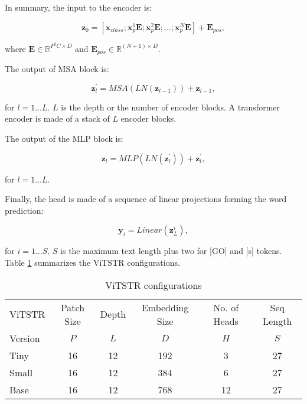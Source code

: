 \documentclass[runningheads]{llncs}
\begin{document}
In summary, the input to the encoder is:

\begin{equation}
\label{eq:encoder_input}
\textbf{z}_{0}=[\textbf{x}_{class};\textbf{x}^{1}_{p}\textbf{E};\textbf{x}^{2}_{p}\textbf{E};...;\textbf{x}^{N}_{p}\textbf{E}] + \textbf{E}_{pos},    
\end{equation}

where $\textbf{E}\in\mathbb{R}^{P^2C\times{D}}$ and $\textbf{E}_{pos}\in\mathbb{R}^{ (N+1)\times{D} }$.

The output of MSA block is:

\begin{equation}
\label{eq:msa}
\textbf{z}^{'}_{l}=MSA(LN(\textbf{z}_{l-1})) + \textbf{z}_{l-1},     
\end{equation}


for $l=1...L$. $L$ is the depth or the number of encoder blocks. A transformer encoder is made of a stack of $L$ encoder blocks. 

The output of the MLP block is:

\begin{equation}
\label{eq:mlp}
\textbf{z}_{l}=MLP(LN(\textbf{z}^{'}_{l})) + \textbf{z}^{'}_{l},  
\end{equation}


for $l=1...L$.

Finally, the head is made of a sequence of linear projections forming the word prediction:

\begin{equation}
   \label{eq:head}
\textbf{y}_{i}=Linear(\textbf{z}^{i}_{L}), 
\end{equation}





for $i=1...S$. $S$ is the maximum text length plus two for [GO] and [s] tokens. Table \ref{tab:vitstr_config} summarizes the ViTSTR configurations.


\begin{table}
\caption{ViTSTR configurations}
\label{tab:vitstr_config}

\begin{center}
\begin{tabular}{|l | c | c | c | c | c|}

\hline

ViTSTR  & Patch Size & Depth & Embedding Size  & No. of Heads &  Seq Length\\
Version  & $P$ & $L$ & $D$  & $H$ &  $S$\\
\hline
Tiny & 16 & 12 & 192 & 3 & 27  \\
\hline
Small & 16 & 12 & 384 & 6 & 27  \\
\hline
Base & 16 & 12 & 768 & 12 & 27  \\
\hline

\end{tabular}
\end{center}
\end{table}
\end{document}
